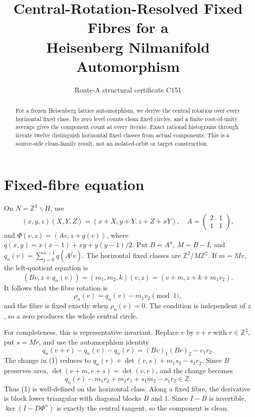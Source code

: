\documentclass[10pt]{article}
\title{\vspace{-1.8em}Central-Rotation-Resolved Fixed Fibres for a\\Heisenberg Nilmanifold Automorphism}
\author{Route-A structural certificate C151}
\date{}
\begin{document}
\maketitle
\begin{abstract}
For a frozen Heisenberg lattice automorphism, we derive the central rotation
over every horizontal fixed class.  Its zero level counts clean fixed circles,
and a finite root-of-unity average gives the component count at every iterate.
Exact rational histograms through iterate twelve distinguish horizontal fixed
classes from actual components.  This is a source-side clean-family result,
not an isolated-orbit or target construction.
\end{abstract}

\section{Fixed-fibre equation}
On $N=\mathbb Z^3\backslash H$, use
\[
(x,y,z)(X,Y,Z)=(x+X,y+Y,z+Z+xY),\quad
A=\begin{pmatrix}2&1\\1&1\end{pmatrix},
\]
and $\Phi(v,z)=(Av,z+q(v))$, where
$q(x,y)=x(x-1)+xy+y(y-1)/2$.  Put $B=A^n$, $M=B-I$, and
$q_n(v)=\sum_{j=0}^{n-1}q(A^jv)$.  The horizontal fixed classes are
$\mathbb Z^2/M\mathbb Z^2$.  If $m=Mv$, the left-quotient equation is
\[
(Bv,z+q_n(v))=(m_1,m_2,k)(v,z)
              =(v+m,z+k+m_1v_2).
\]
It follows that the fibre rotation is
\begin{equation}
 \rho_n(v)=q_n(v)-m_1v_2\pmod 1,                 \tag{1}
\end{equation}
and the fibre is fixed exactly when $\rho_n(v)=0$.  The condition is
independent of $z$, so a zero produces the whole central circle.

For completeness, this is representative invariant.  Replace $v$ by $v+r$
with $r\in\mathbb Z^2$, put $s=Mr$, and use the automorphism identity
\[
q_n(v+r)-q_n(v)-q_n(r)=(Bv)_1(Br)_2-v_1r_2.
\]
The change in (1) reduces to
$q_n(r)+\det(v,s)+m_1s_2-s_1r_2$.  Since $B$ preserves area,
$\det(v+m,r+s)=\det(v,r)$, and the change becomes
\[
q_n(r)-m_1r_2+m_2r_1+s_1m_2-s_1r_2\in\mathbb Z.
\]
Thus (1) is well-defined on the horizontal class.  Along a fixed fibre, the derivative is
block lower triangular with diagonal blocks $B$ and $1$.  Since $I-B$ is
invertible, $\ker(I-D\Phi^n)$ is exactly the central tangent, so the component
is clean.
\end{document}

